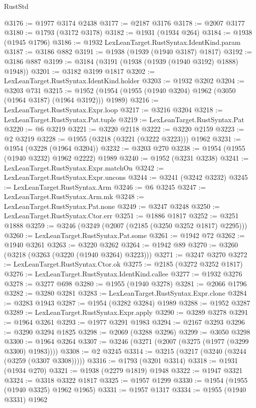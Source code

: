 \begin{lexlean}{RustStd}
\begin{coremodule}
@3176 := @1977 @3174 @2438
@3177 := @2187 @3176
@3178 := @2007 @3177
@3180 := @1793 (@3172 @3178)
@3182 := @1931 (@1934 @264)
@3184 := @1938 (@1945 @1796)
@3186 := @1932 LexLeanTarget.RustSyntax.IdentKind.param
@3187 := @3186 @882
@3191 := @1938 (@1939 (@1940 @3187) @1817)
@3192 := @3186 @887
@3199 := @3184 (@3191 (@1938 (@1939 (@1940 @3192) @1888) @1948))
@3201 := @3182 @3199 @1817
@3202 := LexLeanTarget.RustSyntax.IdentKind.holder
@3203 := @1932 @3202
@3204 := @3203 @731
@3215 := @1952 (@1954 (@1955 (@1940 @3204) @1962 (@3050 (@1964 @3187) (@1964 @3192))) @1989)
@3216 := LexLeanTarget.RustSyntax.Expr.loop
@3217 := @3216 @3204
@3218 := LexLeanTarget.RustSyntax.Pat.tuple
@3219 := LexLeanTarget.RustSyntax.Pat
@3220 := @6 @3219
@3221 := @3220 @2118
@3222 := @3220 @2159
@3223 := @2 @3219
@3228 := @1955 (@3218 (@3221 (@3222 @3223))) @1962
@3231 := @1954 (@3228 (@1964 @3204))
@3232 := @3203 @270
@3238 := @1954 (@1955 (@1940 @3232) @1962 @2222) @1989
@3240 := @1952 (@3231 @3238)
@3241 := LexLeanTarget.RustSyntax.Expr.matchOn
@3242 := LexLeanTarget.RustSyntax.Expr.uncons
@3244 := @3241 (@3242 @3232)
@3245 := LexLeanTarget.RustSyntax.Arm
@3246 := @6 @3245
@3247 := LexLeanTarget.RustSyntax.Arm.mk
@3248 := LexLeanTarget.RustSyntax.Pat.none
@3249 := @3247 @3248
@3250 := LexLeanTarget.RustSyntax.Ctor.err
@3251 := @1886 @1817
@3252 := @3251 @1888
@3259 := @3246 (@3249 (@2007 (@2185 (@3250 @3252 @1817) @2295)))
@3260 := LexLeanTarget.RustSyntax.Pat.some
@3261 := @1942 @72
@3262 := @1940 @3261
@3263 := @3220 @3262
@3264 := @1942 @89
@3270 := @3260 (@3218 (@3263 (@3220 (@1940 @3264) @3223)))
@3271 := @3247 @3270
@3272 := LexLeanTarget.RustSyntax.Ctor.ok
@3275 := @2185 (@3272 @3252 @1817)
@3276 := LexLeanTarget.RustSyntax.IdentKind.callee
@3277 := @1932 @3276
@3278 := @3277 @698
@3280 := @1955 (@1940 @3278)
@3281 := @2066 @1796
@3282 := @3280 @3281
@3283 := LexLeanTarget.RustSyntax.Expr.clone
@3284 := @3283 @1943
@3287 := @1954 (@3282 @3284) @1989
@3288 := @1952 @3287
@3289 := LexLeanTarget.RustSyntax.Expr.apply
@3290 := @3289 @3278
@3291 := @1964 @3261
@3293 := @1977 @3291 @1983
@3294 := @2167 @3293
@3296 := @3290 @3294 @1825
@3298 := @2069 (@3288 @3296)
@3299 := @3050 @3298
@3300 := @1964 @3264
@3307 := @3246 (@3271 (@2007 (@3275 (@1977 (@3299 @3300) @1983))))
@3308 := @2 @3245
@3314 := @3215 (@3217 (@3240 (@3244 (@3259 (@3307 @3308)))))
@3316 := @1793 (@3201 @3314)
@3318 := @1931 (@1934 @270)
@3321 := @1938 (@2279 @1819) @1948
@3322 := @1947 @3321
@3324 := @3318 @3322 @1817
@3325 := @1957 @1299
@3330 := @1954 (@1955 (@1940 @3325) @1962 @1965)
@3331 := @1957 @1317
@3334 := @1955 (@1940 @3331) @1962

\end{coremodule}
\end{lexlean}
